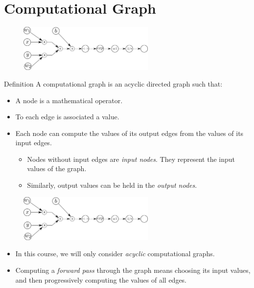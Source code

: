 \documentclass{book}
\begin{document}
\section{Computational Graph}

\begin{figure}[h]
    \centering
    \includegraphics[width=0.6\textwidth]{comp_graph2}
\end{figure}

\begin{block}{Definition}
A computational graph is an acyclic directed graph such that:
\begin{itemize}
\item A node is a mathematical operator.
\item To each edge is associated a value.
\item Each node can compute the values of its output edges from the values of its input edges.
    \begin{itemize}
    \item Nodes without input edges are \emph{input nodes}. They represent the input values of the graph.
    \item Similarly, output values can be held in the \emph{output nodes}.
    \end{itemize}
\end{itemize}
\end{block}

\begin{figure}[h]
    \centering
    \includegraphics[width=0.6\textwidth]{comp_graph2}
\end{figure}

\begin{itemize}
\item In this course, we will only consider \emph{acyclic} computational graphs.
\item Computing a \emph{forward pass} through the graph means choosing its input values, and then progressively computing the values of all edges.
\end{itemize}
\end{document}
